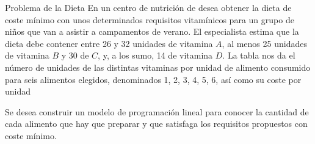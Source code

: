 \begin{frameExample}{Problema de la Dieta}{}
  En un centro de nutrición de desea obtener la dieta de coste mínimo con unos determinados requisitos vitamínicos para un grupo de niños que van a asistir a campamentos de verano. El especialista estima que la dieta debe contener entre 26 y 32 unidades de vitamina $A$, al menos 25 unidades de vitamina $B$ y 30 de $C$, y, a los sumo, 14 de vitamina $D$. La tabla nos da el número de unidades de las distintas vitaminas por unidad de alimento consumido para seis alimentos elegidos, denominados 1, 2, 3, 4, 5, 6, así como su coste por unidad


  Se desea construir un modelo de programación lineal para conocer la cantidad de cada alimento que hay que preparar y que satisfaga los requisitos propuestos con coste mínimo.
\end{frameExample}

